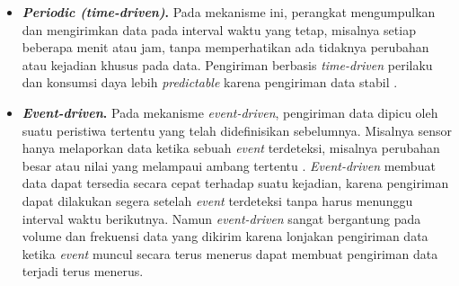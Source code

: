 \begin{itemize}
    \item \textbf{\textit{Periodic (time-driven)}.}
    Pada mekanisme ini, perangkat mengumpulkan dan mengirimkan data pada interval waktu yang tetap, misalnya setiap beberapa menit atau jam, tanpa memperhatikan ada tidaknya perubahan atau kejadian khusus pada data.
    Pengiriman berbasis \textit{time-driven} perilaku dan konsumsi daya lebih \textit{predictable} karena pengiriman data stabil \parencite{Albert2004_Event_Time_Triggered_Comparison}.

    \item \textbf{\textit{Event-driven}.}
    Pada mekanisme \textit{event-driven}, pengiriman data dipicu oleh suatu peristiwa tertentu yang telah didefinisikan sebelumnya.
    Misalnya sensor hanya melaporkan data ketika sebuah \textit{event} terdeteksi, misalnya perubahan besar atau nilai yang melampaui ambang tertentu \parencite{Akyildiz_Vuran_2010_WSN_Algorithms}.
    \textit{Event-driven} membuat data dapat tersedia secara cepat terhadap suatu kejadian, karena pengiriman dapat dilakukan segera setelah \textit{event} terdeteksi tanpa harus menunggu interval waktu berikutnya.
    Namun \textit{event-driven} sangat bergantung pada volume dan frekuensi data yang dikirim karena lonjakan pengiriman data ketika \textit{event} muncul secara terus menerus dapat membuat pengiriman data terjadi terus menerus.


\end{itemize}
